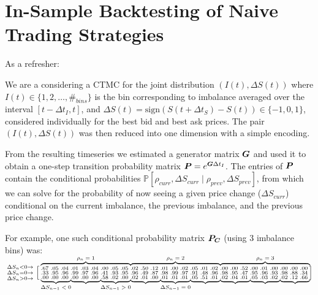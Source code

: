 \section{In-Sample Backtesting of Naive Trading Strategies}
As a refresher: 

We are a considering a CTMC for the joint distribution $(I(t), \Delta S(t))$ where $I(t) \in \lbrace 1,2,\dots,\#_{bins} \rbrace$ is the bin corresponding to imbalance averaged over the interval $[t-\Delta t_I, t]$, and $\Delta S(t) = \text{sign}(S(t+\Delta t_S)-S(t)) \in \lbrace -1, 0, 1 \rbrace$, considered individually for the best bid and best ask prices. The pair $(I(t), \Delta S(t))$ was then reduced into one dimension with a simple encoding.

From the resulting timeseries we estimated a generator matrix $\boldsymbol{G}$ and used it to obtain a one-step transition probability matrix $\boldsymbol{P} = e^{\boldsymbol{G}\Delta t_I}$. The entries of $\boldsymbol{P}$ contain the conditional probabilities $\mathbb{P}\left[ \rho_{curr}, \Delta S_{curr} \; | \; \rho_{prev}, \Delta S_{prev} \right]$, from which we can solve for the probability of now seeing a given price change ($\Delta S_{curr}$) conditional on the current imbalance, the previous imbalance, and the previous price change.

For example, one such conditional probability matrix $\boldsymbol{P_C}$ (using 3 imbalance bins) was:

$$  \begin{smallmatrix}
    \Delta S_n < 0 \rightarrow \\
    \Delta S_n = 0 \rightarrow \\
    \Delta S_n > 0 \rightarrow
  \end{smallmatrix}
  \left [
    \begin{smallmatrix}
\overmat{\rho_n = 1}{.67 & .05 & .04 & .01 & .03 & .04 & .00 & .05 & .05} & \overmat{\rho_n = 2}{.02 & .50 & .12 & .01 & .00 & .02 & .05 & .01 & .02} & 
\overmat{\rho_n = 3}{.00 & .00 & .52 & .00 & .01 & .00 & .00 & .00 & .00} \\
.33 & .95 & .96 & .99 & .97 & .96 & .41 & .93 & .95 & .96 & .49 & .87 & .98 & .99 & .97 & .91 & .48 & .96 & .98 & .95 & .47 & .95 & .96 & .93 & .98 & .88 & .34 \\ \undermat{\Delta S_{n-1} < 0}{.00 & .00 & .00} & 
\undermat{}{.00 & .00 & .00} & 
\undermat{\Delta S_{n-1} > 0}{.58 & .02 & .00} & 
\undermat{}{.02 & .01 & .00} & 
\undermat{\Delta S_{n-1} = 0}{.01 & .01 & .01} & 
\undermat{}{.05 & .51 & .01} & 
\undermat{}{.02 & .04 & .01} & 
\undermat{}{.05 & .03 & .02} & 
\undermat{}{.02 & .12 & .66}
    \end{smallmatrix}
  \right ]
$$

